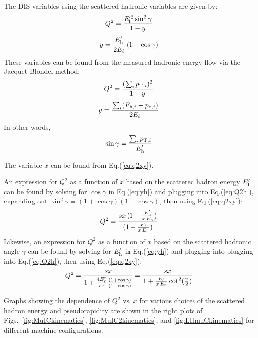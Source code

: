 \documentclass[12pt]{article}
\begin{document}
The DIS variables using the scattered hadronic variables are given by:
%
\begin{equation}
Q^2 = {E^{\prime 2}_{\rm h} \sin^2\gamma \over 1-y}
\label{eq:Q2h}
\end{equation}
\begin{equation}
y = {E^\prime_{\rm h} \over 2 E_\ell} \, (1-\cos\gamma)
\label{eq:yh}
\end{equation}
%
These variables
can be found from the measured hadronic energy flow via the Jacquet-Blondel
method:
%
\begin{equation}
Q^2 = {(\sum_i p_{{\rm T},i})^2 \over 1-y}
  \label{eq:jbmethq}
\end{equation}
\begin{equation}
y = {\sum_i (E_{{\rm h},i}-p_{z,i}) \over 2 E_\ell}
  \label{eq:jbmethy}
\end{equation}
%
In other words,
%
\begin{equation}
  \sin\gamma = {\sum_i p_{{\rm T},i} \over E^\prime_{\rm h}}
  \end{equation} 
%

The variable $x$ can be found from Eq.(\ref{eq:q2xy}). 

An expression for $Q^2$ as a function of $x$ based on the scattered
hadron energy $E^\prime_{\rm h}$ can be found by solving for $\cos\gamma$
in Eq.(\ref{eq:yh}) and plugging into Eq.(\ref{eq:Q2h}), expanding out
$\sin^2\gamma = (1+\cos\gamma)(1-\cos\gamma)$,
then using
Eq.(\ref{eq:q2xy}):
%
\begin{equation}
  Q^2 = {sx\,(1-{E^\prime_{\rm h} \over x\,E_{\rm h}}) \over 
      (1-{E_\ell \over x\,E_{\rm h}})}
\label{eq:q2hp}
\end{equation}
%
Likewise, an expression for $Q^2$ as a function of $x$ based on the
scattered hadronic angle $\gamma$ can be found by solving for $E^\prime_{\rm h}$ in
Eq.(\ref{eq:yh}) and plugging into plugging into Eq.(\ref{eq:Q2h}), then using
Eq.(\ref{eq:q2xy}):
%
\begin{equation}
Q^2 = {sx \over {1 + {4E^2_\ell \over sx} }{(1+\cos\gamma)
    \over (1-\cos\gamma) } } = {sx \over {1 + {E_\ell \over x\, E_{\rm h}} \cot^2({\gamma \over 2}) } }
\label{eq:q2hgamma}
\end{equation}

Graphs showing the dependence of $Q^2$ vs. $x$ for various choices of the scattered hadron energy and pseudorapidity are shown in the right plots of Figs.~\ref{fig:MuICkinematics}, \ref{fig:MuIC2kinematics}, and \ref{fig:LHmuCkinematics} for different machine configurations. 
\end{document}
